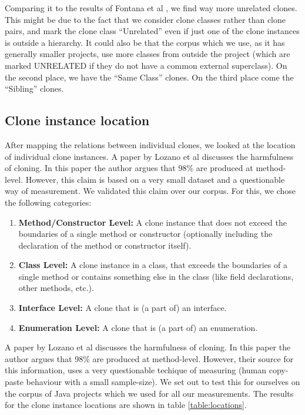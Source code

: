 \documentclass[a4paper]{article}
\begin{document}
Comparing it to the results of Fontana et al \cite{fontana2015duplicated}, we find way more unrelated clones. This might be due to the fact that we consider clone classes rather than clone pairs, and mark the clone class ``Unrelated'' even if just one of the clone instances is outside a hierarchy. It could also be that the corpus which we use, as it has generally smaller projects, use more classes from outside the project (which are marked UNRELATED if they do not have a common external superclass). On the second place, we have the ``Same Class'' clones. On the third place come the ``Sibling'' clones.

\subsection{Clone instance location}
After mapping the relations between individual clones, we looked at the location of individual clone instances. A paper by Lozano et al \cite{lozano2007evaluating} discusses the harmfulness of cloning. In this paper the author argues that 98\% are produced at method-level. However, this claim is based on a very small dataset and a questionable way of measurement. We validated this claim over our corpus. For this, we chose the following categories:
\begin{enumerate}
  \item \textbf{Method/Constructor Level:} A clone instance that does not exceed the boundaries of a single method or constructor (optionally including the declaration of the method or constructor itself).
  \item \textbf{Class Level:} A clone instance in a class, that exceeds the boundaries of a single method or contains something else in the class (like field declarations, other methods, etc.).
  \item \textbf{Interface Level:} A clone that is (a part of) an interface.
  \item \textbf{Enumeration Level:} A clone that is (a part of) an enumeration.
\end{enumerate}

A paper by Lozano et al \cite{lozano2007evaluating} discusses the harmfulness of cloning. In this paper the author argues that 98\% are produced at method-level. However, their source for this information, uses a very questionable techique of measuring (human copy-paste behaviour with a small sample-size). We set out to test this for ourselves on the corpus of Java projects which we used for all our measurements. The results for the clone instance locations are shown in table \ref{table:locations}.
\end{document}
